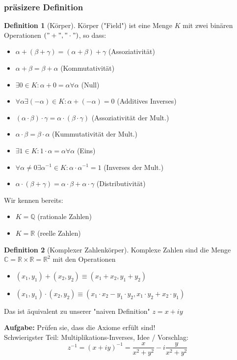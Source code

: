 \documentclass[a4paper]{scrartcl}
\DeclareMathOperator{\Exists}{\exists}
\DeclareMathOperator{\Forall}{\forall}
\theoremstyle{definition}
\newtheorem{defn}{Definition}
\theoremstyle{plain}
\theoremstyle{remark}
\theoremstyle{remark}
\newcommand{\I}{\ensuremath{i}}%
\begin{document}
\subsubsection{präsizere Definition}
\label{sec-5-1-3}
\begin{defn}[Körper]
Körper ("Field") ist eine Menge $K$ mit zwei binären Operationen $("+","\cdot")$, so dass:
\begin{itemize}
\item $\alpha + (\beta + \gamma) = (\alpha + \beta) + \gamma$ \hfill (Assoziativität)
\item $\alpha + \beta = \beta + \alpha$ \hfill (Kommutativität)
\item $\Exists 0 \in K: \alpha + 0 = \alpha \Forall \alpha$ \hfill (Null)
\item $\Forall \alpha \Exists (-\alpha) \in K: \alpha + (-\alpha) = 0$ \hfill (Additives Inverses)
\item $(\alpha \cdot \beta) \cdot \gamma = \alpha \cdot (\beta \cdot \gamma)$ \hfill (Assoziativität der Mult.)
\item $\alpha \cdot \beta = \beta \cdot \alpha$ \hfill (Kummutativität der Mult.)
\item $\Exists 1 \in K: 1\cdot \alpha = \alpha \Forall \alpha$ \hfill (Eins)
\item $\Forall \alpha \neq 0 \Exists \alpha^{-1} \in K: \alpha \cdot \alpha^{-1} = 1$ \hfill (Inverses der Mult.)
\item $\alpha\cdot (\beta + \gamma) = \alpha \cdot \beta + \alpha \cdot \gamma$ \hfill (Distributivität)
\end{itemize}
\end{defn}
Wir kennen bereits:
\begin{itemize}
\item $K = \mathbb{Q}$ \hfill (rationale Zahlen)
\item $K = \mathbb{R}$ \hfill (reelle Zahlen)
\end{itemize}
\begin{defn}[Komplexer Zahlenkörper]
Komplexe Zahlen sind die Menge $\mathbb{C} = \mathbb{R} \times \mathbb{R} = \mathbb{R}^2$ mit den Operationen
\begin{itemize}
\item $(x_1, y_1) + (x_2, y_2) \equiv (x_1 + x_2, y_1 + y_2)$
\item $(x_1, y_1) \cdot (x_2, y_2) \equiv (x_1 \cdot x_2 - y_1 \cdot y_2, x_1 \cdot y_2 + x_2 \cdot y_1)$
\end{itemize}
Das ist äquivalent zu unserer "naiven Definition" $z = x + \I y$
\end{defn}
\textbf{Aufgabe:} Prüfen sie, dass die Axiome erfült sind! \\
    Schwierigster Teil: Multiplikations-Inverses, Idee / Vorschlag:
\[z^{-1} = (x + \I y)^{-1} = \frac{x}{x^2 + y^2} - \I \frac{y}{x^2 + y^2}\]
\end{document}
